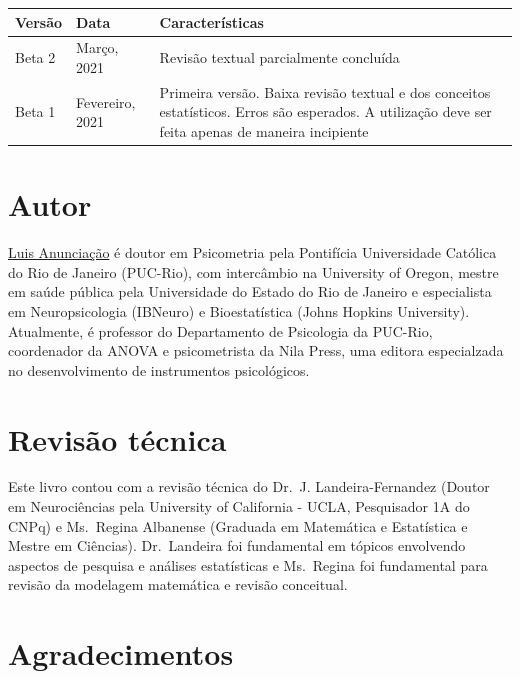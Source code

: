 \documentclass[
]{book}
\begin{document}
\begin{longtable}[]{@{}
  >{\raggedright\arraybackslash}p{}
  >{\raggedright\arraybackslash}p{}
  >{\raggedright\arraybackslash}p{}@{}}
\toprule
Versão & Data & Características \\
\midrule
\endhead
Beta 2 & Março, 2021 & Revisão textual parcialmente concluída \\
Beta 1 & Fevereiro, 2021 & Primeira versão. Baixa revisão textual e dos conceitos estatísticos. Erros são esperados. A utilização deve ser feita apenas de maneira incipiente \\
\bottomrule
\end{longtable}

\hypertarget{autor}{%
\section{Autor}\label{autor}}

\href{http://lattes.cnpq.br/3982200733248687}{Luis Anunciação} é doutor em Psicometria pela Pontifícia Universidade Católica do Rio de Janeiro (PUC-Rio), com intercâmbio na University of Oregon, mestre em saúde pública pela Universidade do Estado do Rio de Janeiro e especialista em Neuropsicologia (IBNeuro) e Bioestatística (Johns Hopkins University). Atualmente, é professor do Departamento de Psicologia da PUC-Rio, coordenador da ANOVA e psicometrista da Nila Press, uma editora especialzada no desenvolvimento de instrumentos psicológicos.

\hypertarget{revisuxe3o-tuxe9cnica}{%
\section{Revisão técnica}\label{revisuxe3o-tuxe9cnica}}

Este livro contou com a revisão técnica do Dr.~J. Landeira-Fernandez (Doutor em Neurociências pela University of California - UCLA, Pesquisador 1A do CNPq) e Ms.~Regina Albanense (Graduada em Matemática e Estatística e Mestre em Ciências). Dr.~Landeira foi fundamental em tópicos envolvendo aspectos de pesquisa e análises estatísticas e Ms.~Regina foi fundamental para revisão da modelagem matemática e revisão conceitual.

\hypertarget{agradecimentos}{%
\section{Agradecimentos}\label{agradecimentos}}
\end{document}
